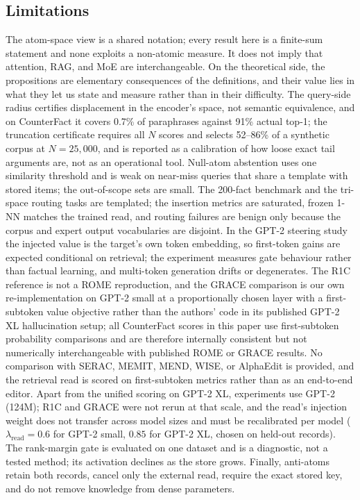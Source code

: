 \documentclass[preprint,12pt]{elsarticle}
\newif\ifmarkchanges
\newcommand{\rev}[1]{#1}
\newcommand{\revii}[1]{\ifmarkchanges{\color{blue}#1}\else#1\fi}
\begin{document}
\subsection{Limitations}
The atom-space view is a shared notation; every result here is a finite-sum statement and none exploits a non-atomic measure. It does not imply that attention, RAG, and MoE are interchangeable. On the theoretical side, \rev{the propositions are elementary consequences of the definitions, and their value lies in what they let us state and measure rather than in their difficulty. The query-side radius certifies displacement in the encoder's space, not semantic equivalence, and on CounterFact it covers 0.7\% of paraphrases against 91\% actual top-1}; the truncation certificate requires all $N$ scores and selects 52--86\% of a synthetic corpus at $N=25{,}000$, and is reported as a calibration of how loose exact tail arguments are, not as an operational tool. \rev{Null-atom abstention uses one similarity threshold and is weak on near-miss queries that share a template with stored items; the out-of-scope sets are small.} The 200-fact benchmark and the tri-space routing tasks are templated; the insertion metrics are saturated, frozen 1-NN matches the trained read, and routing failures are benign only because the corpus and expert output vocabularies are disjoint. In the GPT-2 steering study the injected value is the target's own token embedding, so first-token gains are expected conditional on retrieval; the experiment measures gate behaviour rather than factual learning, and multi-token generation drifts or degenerates. The R1C reference is not a ROME reproduction, and the GRACE comparison is our own re-implementation on GPT-2 small at a proportionally chosen layer with a first-subtoken value objective rather than the authors' code in its published GPT-2 XL hallucination setup; all CounterFact scores in this paper use first-subtoken probability comparisons and are therefore internally consistent but not numerically interchangeable with published ROME or GRACE results. No comparison with SERAC, MEMIT, MEND, WISE, or AlphaEdit is provided, and the retrieval read is scored on first-subtoken metrics rather than as an end-to-end editor. \rev{Apart from the unified scoring on GPT-2 XL, experiments use GPT-2 (124M); R1C and GRACE were not rerun at that scale, and the read's injection weight does not transfer across model sizes and must be recalibrated per model ($\lambda_{\mathrm{read}}=0.6$ for GPT-2 small, $0.85$ for GPT-2 XL, chosen on held-out records).} \rev{The rank-margin gate is evaluated on one \revii{dataset} and is a diagnostic, not a tested method\revii{; its activation declines as the store grows}.} Finally, anti-atoms retain both records, cancel only the external read, require the exact stored key, and do not remove knowledge from dense parameters.
\end{document}
